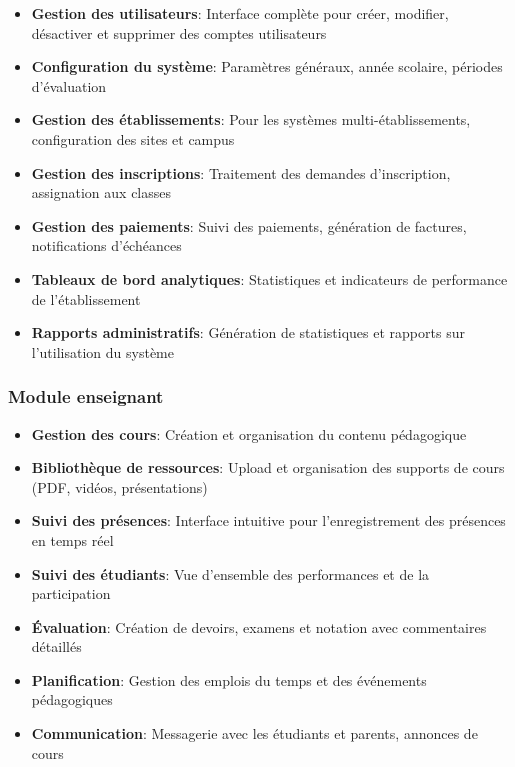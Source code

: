 \begin{itemize}
  \item \textbf{Gestion des utilisateurs}: Interface complète pour créer, modifier, désactiver et supprimer des comptes utilisateurs
  
  \item \textbf{Configuration du système}: Paramètres généraux, année scolaire, périodes d'évaluation
  
  \item \textbf{Gestion des établissements}: Pour les systèmes multi-établissements, configuration des sites et campus
  
  \item \textbf{Gestion des inscriptions}: Traitement des demandes d'inscription, assignation aux classes
  
  \item \textbf{Gestion des paiements}: Suivi des paiements, génération de factures, notifications d'échéances
  
  \item \textbf{Tableaux de bord analytiques}: Statistiques et indicateurs de performance de l'établissement
  
  \item \textbf{Rapports administratifs}: Génération de statistiques et rapports sur l'utilisation du système
\end{itemize}

\subsubsection{Module enseignant}

\begin{itemize}
  \item \textbf{Gestion des cours}: Création et organisation du contenu pédagogique
  
  \item \textbf{Bibliothèque de ressources}: Upload et organisation des supports de cours (PDF, vidéos, présentations)
  
  \item \textbf{Suivi des présences}: Interface intuitive pour l'enregistrement des présences en temps réel
  
  \item \textbf{Suivi des étudiants}: Vue d'ensemble des performances et de la participation
  
  \item \textbf{Évaluation}: Création de devoirs, examens et notation avec commentaires détaillés
  
  \item \textbf{Planification}: Gestion des emplois du temps et des événements pédagogiques
  
  \item \textbf{Communication}: Messagerie avec les étudiants et parents, annonces de cours
\end{itemize}

